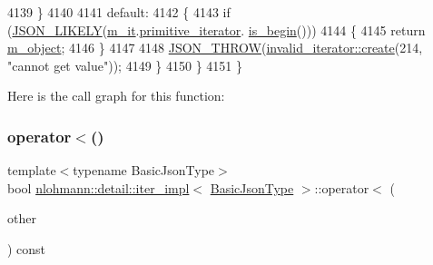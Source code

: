 \begin{DoxyCode}
4139             \}
4140 
4141             \textcolor{keywordflow}{default}:
4142             \{
4143                 \textcolor{keywordflow}{if} (\hyperlink{json_8hpp_a41ecd1c4cf7c3d56477b9b685b5daa72}{JSON\_LIKELY}(\hyperlink{classnlohmann_1_1detail_1_1iter__impl_a8a86a7c0d4af0cc4ab345b6f0e13cdfa}{m\_it}.\hyperlink{structnlohmann_1_1detail_1_1internal__iterator_a2b3bb45f968210e42c282017eeeb63a8}{primitive\_iterator}.
      \hyperlink{classnlohmann_1_1detail_1_1primitive__iterator__t_a8d1a7d46b3fcd06edd034f04ededb5e4}{is\_begin}()))
4144                 \{
4145                     \textcolor{keywordflow}{return} \hyperlink{classnlohmann_1_1detail_1_1iter__impl_aca84f84be598bdfaaddd23d928c42bbb}{m\_object};
4146                 \}
4147 
4148                 \hyperlink{json_8hpp_a6c274f6db2e65c1b66c7d41b06ad690f}{JSON\_THROW}(\hyperlink{classnlohmann_1_1detail_1_1invalid__iterator_a4e849260a3caa1b288c7e619130c6c09}{invalid\_iterator::create}(214, \textcolor{stringliteral}{"cannot get
       value"}));
4149             \}
4150         \}
4151     \}
\end{DoxyCode}
Here is the call graph for this function\+:
\mbox{\label{classnlohmann_1_1detail_1_1iter__impl_a0d14cd76203e00bdcef6a64a5d055cc7}} 
\subsubsection{\texorpdfstring{operator$<$()}{operator<()}}
{\footnotesize\ttfamily template$<$typename Basic\+Json\+Type$>$ \\
bool \hyperlink{classnlohmann_1_1detail_1_1iter__impl}{nlohmann\+::detail\+::iter\+\_\+impl}$<$ \hyperlink{classnlohmann_1_1detail_1_1iter__impl_abf18f18793f84b0222aebb5a2a87da7a}{Basic\+Json\+Type} $>$\+::operator$<$ (\begin{DoxyParamCaption}\item[{const \hyperlink{classnlohmann_1_1detail_1_1iter__impl}{iter\+\_\+impl}$<$ \hyperlink{classnlohmann_1_1detail_1_1iter__impl_abf18f18793f84b0222aebb5a2a87da7a}{Basic\+Json\+Type} $>$ \&}]{other }\end{DoxyParamCaption}) const\hspace{0.3cm}{\ttfamily [inline]}}



